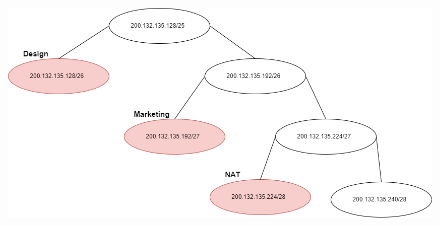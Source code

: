 \documentclass{report}
\begin{document}
\begin{center}
\begin{figure}
    \centering
    \includegraphics[scale=0.5]{IPsPublicosDiagrama.png}
\end{figure}    
\end{center}
\end{document}
